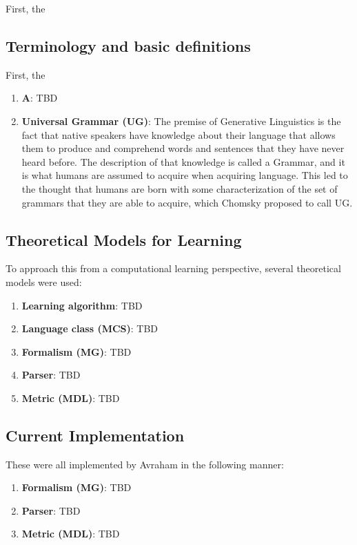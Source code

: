 \documentclass{article}
\begin{document}
First, the 

\subsection{Terminology and basic definitions} %
First, the 
\begin{enumerate}
  \item \textbf{A}: TBD
  \item \textbf{Universal Grammar (UG)}: The premise of Generative Linguistics is the fact that native speakers have knowledge about
their language that allows them to produce and comprehend words and sentences that they have never heard before. The description of that knowledge is called a Grammar, and it is what humans are assumed to acquire when acquiring language. This led to the thought that humans are born with some characterization of the set of grammars that they are able to acquire,  which Chomsky proposed to call UG.
\end{enumerate}

\subsection{Theoretical Models for Learning} %
To approach this from a computational learning perspective, several theoretical models were used:
\begin{enumerate}
  \item \textbf{Learning algorithm}: TBD
  \item \textbf{Language class (MCS)}: TBD
  \item \textbf{Formalism (MG)}: TBD
  \item \textbf{Parser}: TBD
  \item \textbf{Metric (MDL)}: TBD
\end{enumerate}

\subsection{Current Implementation} 
These were all implemented by Avraham in the following manner:
\begin{enumerate}
  \item \textbf{Formalism (MG)}: TBD
  \item \textbf{Parser}: TBD
  \item \textbf{Metric (MDL)}: TBD
\end{enumerate}
\end{document}
